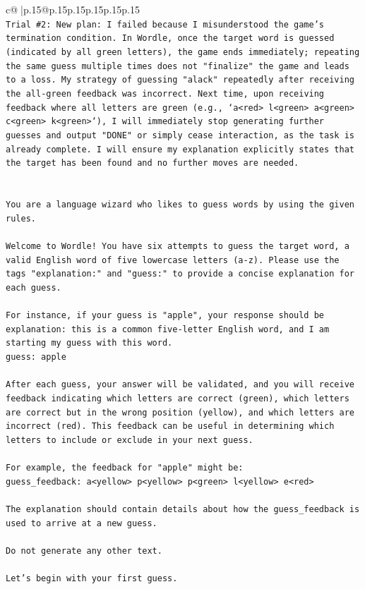 \documentclass{article}
\begin{document}
{\begin{supertabular}{c@{$\;$}|p{.15\linewidth}@{}p{.15\linewidth}p{.15\linewidth}p{.15\linewidth}p{.15\linewidth}p{.15\linewidth}}
{{{\\ 
\texttt{Trial \#2: New plan: I failed because I misunderstood the game's termination condition. In Wordle, once the target word is guessed (indicated by all green letters), the game ends immediately; repeating the same guess multiple times does not "finalize" the game and leads to a loss. My strategy of guessing "alack" repeatedly after receiving the all{-}green feedback was incorrect. Next time, upon receiving feedback where all letters are green (e.g., `a<red> l<green> a<green> c<green> k<green>`), I will immediately stop generating further guesses and output "DONE" or simply cease interaction, as the task is already complete. I will ensure my explanation explicitly states that the target has been found and no further moves are needed.} \\
\\ 
\\ 
\texttt{You are a language wizard who likes to guess words by using the given rules.} \\
\\ 
\texttt{Welcome to Wordle! You have six attempts to guess the target word, a valid English word of five lowercase letters (a{-}z). Please use the tags "explanation:" and "guess:" to provide a concise explanation for each guess.} \\
\\ 
\texttt{For instance, if your guess is "apple", your response should be} \\
\texttt{explanation: this is a common five{-}letter English word, and I am starting my guess with this word.} \\
\texttt{guess: apple} \\
\\ 
\texttt{After each guess, your answer will be validated, and you will receive feedback indicating which letters are correct (green), which letters are correct but in the wrong position (yellow), and which letters are incorrect (red). This feedback can be useful in determining which letters to include or exclude in your next guess.} \\
\\ 
\texttt{For example, the feedback for "apple" might be:} \\
\texttt{guess\_feedback: a<yellow> p<yellow> p<green> l<yellow> e<red>} \\
\\ 
\texttt{The explanation should contain details about how the guess\_feedback is used to arrive at a new guess.} \\
\\ 
\texttt{Do not generate any other text.} \\
\\ 
\texttt{Let's begin with your first guess.} \\
            }
        }
    }
     \\ \\


\end{supertabular}}
\end{document}
